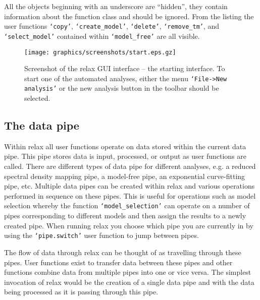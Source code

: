 All the objects beginning with an underscore are ``hidden'', they contain information about the function class and should be ignored.  From the listing the user functions \texttt{`copy'}, \texttt{`create\_model'}, \texttt{`delete'}, \texttt{`remove\_tm'}, and \texttt{`select\_model'} contained within \texttt{`model\_free'} are all visible.

\begin{figure}
\centerline{\texttt{[image: graphics/screenshots/start.eps.gz]}}
\caption[GUI screenshot]{Screenshot of the relax GUI interface -- the starting interface.  To start one of the automated analyses, either the menu \texttt{`File->New analysis'} or the new analysis button in the toolbar should be selected.}\label{fig: GUI screenshot - start}
\end{figure}




\subsection{The data pipe}

Within relax all user functions operate on data stored within the current data pipe.  This pipe stores data is input, processed, or output as user functions are called.  There are different types of data pipe for different analyses, e.g. a reduced spectral density mapping pipe, a model-free pipe, an exponential curve-fitting pipe, etc.  Multiple data pipes can be created within relax and various operations performed in sequence on these pipes.  This is useful for operations such as model selection whereby the function \texttt{`model\_selection'} can operate on a number of pipes corresponding to different models and then assign the results to a newly created pipe.  When running relax you choose which pipe you are currently in by using the \texttt{`pipe.switch'} user function to jump between pipes. 

The flow of data through relax can be thought of as travelling through these pipes.  User functions exist to transfer data between these pipes and other functions combine data from multiple pipes into one or vice versa.  The simplest invocation of relax would be the creation of a single data pipe and with the data being processed as it is passing through this pipe.

